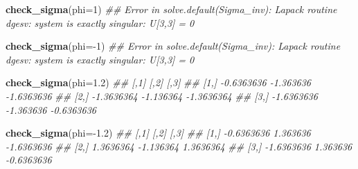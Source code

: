 \documentclass[11pt,ignorenonframetext,]{beamer}
\newenvironment{Shaded}{}{}
\newcommand{\CommentTok}[1]{\textcolor[rgb]{0.38,0.63,0.69}{\textit{#1}}}
\newcommand{\DataTypeTok}[1]{\textcolor[rgb]{0.56,0.13,0.00}{#1}}
\newcommand{\DecValTok}[1]{\textcolor[rgb]{0.25,0.63,0.44}{#1}}
\newcommand{\FloatTok}[1]{\textcolor[rgb]{0.25,0.63,0.44}{#1}}
\newcommand{\KeywordTok}[1]{\textcolor[rgb]{0.00,0.44,0.13}{\textbf{#1}}}
\newcommand{\NormalTok}[1]{#1}
\newcommand{\OperatorTok}[1]{\textcolor[rgb]{0.40,0.40,0.40}{#1}}
\let\oldShaded\Shaded
\let\endoldShaded\endShaded
\renewenvironment{Shaded}{\footnotesize\begin{spacing}{0.9}\oldShaded}{\endoldShaded\end{spacing}}
\begin{document}
\begin{frame}[fragile]{}
\protect\hypertarget{section-2}{}

\begin{Shaded}
\begin{Highlighting}[]
\KeywordTok{check_sigma}\NormalTok{(}\DataTypeTok{phi=}\DecValTok{1}\NormalTok{)}
\CommentTok{## Error in solve.default(Sigma_inv): Lapack routine dgesv: system is exactly singular: U[3,3] = 0}

\KeywordTok{check_sigma}\NormalTok{(}\DataTypeTok{phi=}\OperatorTok{-}\DecValTok{1}\NormalTok{)}
\CommentTok{## Error in solve.default(Sigma_inv): Lapack routine dgesv: system is exactly singular: U[3,3] = 0}

\KeywordTok{check_sigma}\NormalTok{(}\DataTypeTok{phi=}\FloatTok{1.2}\NormalTok{)}
\CommentTok{##            [,1]      [,2]       [,3]}
\CommentTok{## [1,] -0.6363636 -1.363636 -1.6363636}
\CommentTok{## [2,] -1.3636364 -1.136364 -1.3636364}
\CommentTok{## [3,] -1.6363636 -1.363636 -0.6363636}

\KeywordTok{check_sigma}\NormalTok{(}\DataTypeTok{phi=}\OperatorTok{-}\FloatTok{1.2}\NormalTok{)}
\CommentTok{##            [,1]      [,2]       [,3]}
\CommentTok{## [1,] -0.6363636  1.363636 -1.6363636}
\CommentTok{## [2,]  1.3636364 -1.136364  1.3636364}
\CommentTok{## [3,] -1.6363636  1.363636 -0.6363636}
\end{Highlighting}
\end{Shaded}

\end{frame}
\end{document}
